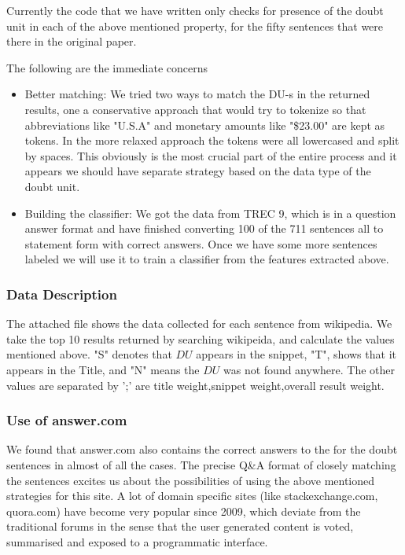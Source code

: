 \documentclass[11pt]{article}
\begin{document}
Currently the code that we have written only checks for presence of the doubt unit in each of the above mentioned property, for the fifty sentences that were there in the original paper. 

The following are the immediate concerns 
\begin{itemize}
\item Better matching: We tried two ways to match the DU-s in the returned results, one a conservative approach that would try to tokenize so that abbreviations like "U.S.A" and monetary amounts like "\$23.00" are kept as tokens. In the more relaxed approach the tokens were all lowercased and split by spaces. This obviously is the most crucial part of the entire process and it appears we should have separate strategy based on the data type of the doubt unit.
\item Building the classifier: We got the data from TREC 9, which is in a question answer format and have finished converting 100 of the 711 sentences all to statement form with correct answers. Once we have some more sentences labeled we will use it to train a classifier from the features extracted above.
\end{itemize} 

\subsubsection{Data Description}
The attached file shows the data collected for each sentence from wikipedia. We take the top 10 results returned by searching wikipeida, and calculate the values mentioned above. "S" denotes that $DU$ appears in the snippet, "T", shows that it appears in the Title, and "N" means the $DU$ was not found anywhere. The other values are separated by ';' are title weight,snippet weight,overall result weight.
 
\subsubsection{Use of answer.com}
We found that answer.com also contains the correct answers to the for the doubt sentences in almost of all the cases. The precise Q\&A format of closely matching the sentences excites us about the possibilities of using the above mentioned strategies for this site. A lot of domain specific sites (like stackexchange.com, quora.com) have become very popular since 2009, which deviate from the traditional forums in the sense that the user generated content is voted, summarised and exposed to a programmatic interface. 
\end{document}
